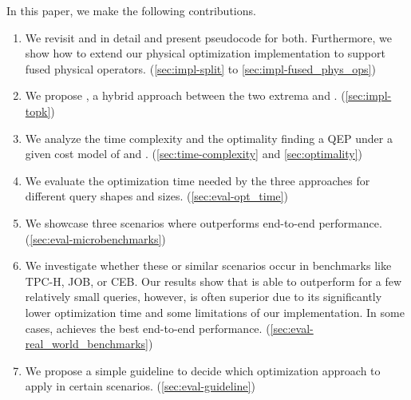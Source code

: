 In this paper, we make the following contributions.
\begin{enumerate}[leftmargin=.55cm]
    \item We revisit \split and \holistic in detail and present pseudocode for both.  Furthermore, we show how to extend our physical optimization implementation to support fused physical operators. (\autoref{sec:impl-split} to \autoref{sec:impl-fused_phys_ops})
    \item We propose \topk, a hybrid approach between the two extrema \split and \holistic. (\autoref{sec:impl-topk})
    \item We analyze the time complexity and the optimality \wrt finding a QEP under a given cost model of \split and \holistic.  (\autoref{sec:time-complexity} and \autoref{sec:optimality})
    \item We evaluate the optimization time needed by the three approaches for different query shapes and sizes.  (\autoref{sec:eval-opt_time})
    \item We showcase three scenarios where \holistic outperforms \split \wrt end-to-end performance.  (\autoref{sec:eval-microbenchmarks})
    \item We investigate whether these or similar scenarios occur in benchmarks like TPC-H, JOB, or CEB.  Our results show that \holistic is able to outperform \split for a few relatively small queries, however, \split is often superior due to its significantly lower optimization time and some limitations of our implementation.  In some cases, \topk achieves the best end-to-end performance.  (\autoref{sec:eval-real_world_benchmarks})
    \item We propose a simple guideline to decide which optimization approach to apply in certain scenarios.  (\autoref{sec:eval-guideline})
\end{enumerate}
